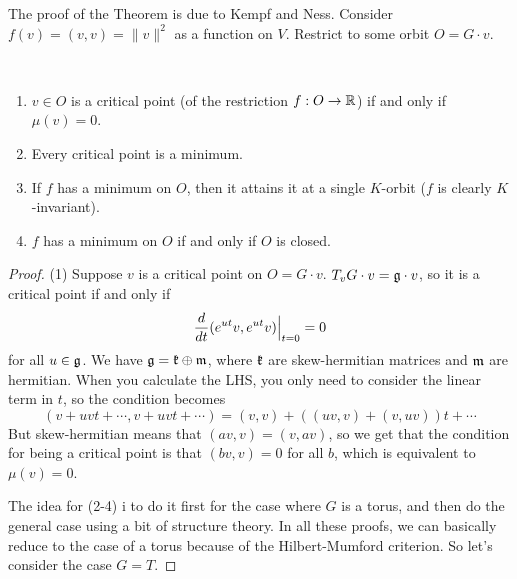 The proof of the Theorem is due to Kempf and Ness. Consider $f(v)=(v,v)=\|v\|^2$ as a function on $V$. Restrict to some orbit $O=G\cdot v$.
\begin{proposition}{\ }
 \begin{enumerate}
  \item $v\in O$ is a critical point (of the restriction $f:O\to \mathbb{R}$) if and only if $\mu(v)=0$.
  \item Every critical point is a minimum.
  \item If $f$ has a minimum on $O$, then it attains it at a single $K$-orbit ($f$ is clearly $K$-invariant).
  \item $f$ has a minimum on $O$ if and only if $O$ is closed.
 \end{enumerate}
\end{proposition}
\begin{proof}
 (1) Suppose $v$ is a critical point on $O=G\cdot v$. $T_v G\cdot v=\mathfrak{g}\cdot v$, so it is a critical point if and only if 
 \[
  \frac{d }{d t}(e^{ut}v,e^{ut}v)\Bigr|_{t=0}=0
 \]
 for all $u\in \mathfrak{g}$. We have $\mathfrak{g}=\mathfrak{k}\oplus \mathfrak{m}$, where $\mathfrak{k}$ are skew-hermitian matrices and $\mathfrak{m}$ are hermitian. When you calculate the LHS, you only need to consider the linear term in $t$, so the condition becomes
 \[
  (v+uvt+\cdots,v+uvt+\cdots)=(v,v) + ((uv,v)+(v,uv))t+\cdots
 \]
 But skew-hermitian means that $(av,v)=(v,av)$, so we get that the condition for being a critical point is that $(bv,v)=0$ for all $b$, which is equivalent to $\mu(v)=0$.
 
 The idea for (2-4) i to do it first for the case where $G$ is a torus, and then do the general case using a bit of structure theory. In all these proofs, we can basically reduce to the case of a torus because of the Hilbert-Mumford criterion. So let's consider the case $G=T$.
 

\end{proof}
